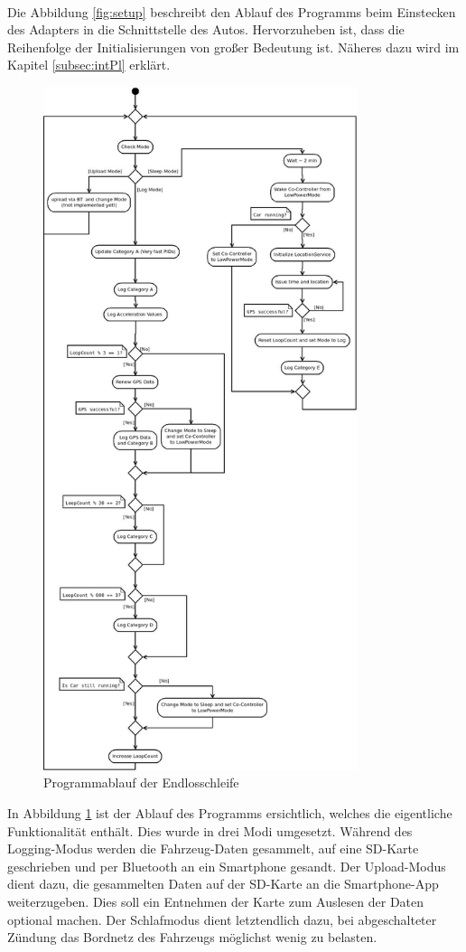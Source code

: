 \paragraph{}
Die Abbildung \ref{fig:setup} beschreibt den Ablauf des Programms beim Einstecken des Adapters in die Schnittstelle des Autos. Hervorzuheben ist, dass die Reihenfolge der Initialisierungen von großer Bedeutung ist. Näheres dazu wird im Kapitel \ref{subsec:intPl} erklärt.
\begin{figure}
	\begin{center}
		\includegraphics[width=\textwidth,height=20cm,keepaspectratio]{./img/ProgLoop}
		\caption{Programmablauf der Endlosschleife}
		\label{fig:loop}
	\end{center}
\end{figure}
In Abbildung \ref{fig:loop} ist der Ablauf des Programms ersichtlich, welches die eigentliche Funktionalität enthält. Dies wurde in drei Modi umgesetzt. Während des Logging-Modus werden die Fahrzeug-Daten gesammelt, auf eine SD-Karte geschrieben und per Bluetooth an ein Smartphone gesandt. Der Upload-Modus dient dazu, die gesammelten Daten auf der SD-Karte an die Smartphone-App weiterzugeben. Dies soll ein Entnehmen der Karte zum Auslesen der Daten optional machen. Der Schlafmodus dient letztendlich dazu, bei abgeschalteter Zündung das Bordnetz des Fahrzeugs möglichst wenig zu belasten.
